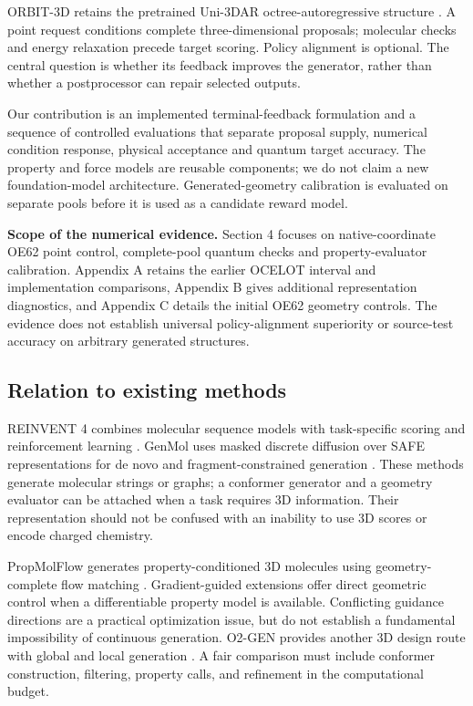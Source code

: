 \documentclass[11pt,a4paper]{article}
\begin{document}
ORBIT-3D retains the pretrained Uni-3DAR octree-autoregressive structure
\citep{lu2025uni3dar}. A point request conditions complete
three-dimensional proposals; molecular checks and energy relaxation
precede target scoring. Policy alignment is optional. The central
question is whether its feedback improves the generator, rather than
whether a postprocessor can repair selected outputs.

Our contribution is an implemented terminal-feedback formulation and a
sequence of controlled evaluations that separate proposal supply,
numerical condition response, physical acceptance and quantum target
accuracy. The property and force models are reusable components; we do
not claim a new foundation-model architecture. Generated-geometry
calibration is evaluated on separate pools before it is used as a
candidate reward model.

\textbf{Scope of the numerical evidence.} Section 4 focuses on
native-coordinate OE62 point control, complete-pool quantum checks and
property-evaluator calibration. Appendix A retains the earlier OCELOT
interval and implementation comparisons, Appendix B gives additional
representation diagnostics, and Appendix C details the initial OE62
geometry controls. The evidence does not establish universal
policy-alignment superiority or source-test accuracy on arbitrary
generated structures.

\FloatBarrier
\subsection{Relation to existing
methods}\label{relation-to-existing-methods}

REINVENT 4 combines molecular sequence models with task-specific scoring
and reinforcement learning \citep{loeffler2024reinvent4}. GenMol uses
masked discrete diffusion over SAFE representations for de novo and
fragment-constrained generation \citep{lee2025genmol}. These methods
generate molecular strings or graphs; a conformer generator and a
geometry evaluator can be attached when a task requires 3D information.
Their representation should not be confused with an inability to use 3D
scores or encode charged chemistry.

PropMolFlow generates property-conditioned 3D molecules using
geometry-complete flow matching \citep{zeng2026propmolflow}.
Gradient-guided extensions offer direct geometric control when a
differentiable property model is available. Conflicting guidance
directions are a practical optimization issue, but do not establish a
fundamental impossibility of continuous generation. O2-GEN provides
another 3D design route with global and local generation
\citep{zhao2026o2gen}. A fair comparison must include conformer
construction, filtering, property calls, and refinement in the
computational budget.
\end{document}
